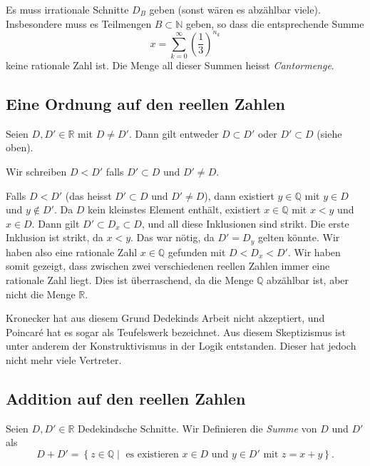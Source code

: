 \documentclass[../main.tex]{subfiles}
\begin{document}
Es muss irrationale Schnitte $D_{B}$ geben (sonst wären es abzählbar viele).
Insbesondere muss es Teilmengen $B \subset \mathbb N$ geben, so dass die
entsprechende Summe
\[x = \sum_{k=0}^{\infty} {\left(\frac{1}{3}\right)}^{n_{k}}\]
keine rationale Zahl ist.
Die Menge all dieser Summen heisst \emph{Cantormenge}.

\subsection*{Eine Ordnung auf den reellen Zahlen}
Seien $D, D' \in \mathbb R$ mit $D \neq D'$. Dann gilt entweder
$D \subset D'$ oder $D' \subset D$ (siehe oben).
\begin{definition}
  Wir schreiben $D < D'$ falls $D' \subset D$ und $D' \neq D$.
\end{definition}

\begin{remark}
  Falls $D < D'$ (das heisst $D' \subset D$ und $D' \neq D$), dann
  existiert $y \in \mathbb Q$ mit $y \in D$ und $y \notin D'$.
  Da $D$ kein kleinstes Element enthält,
  existiert $x \in \mathbb Q$ mit $x < y$ und $x \in D$.
  Dann gilt $D' \subset D_{x} \subset D$, und all diese
  Inklusionen sind strikt. Die erste Inklusion ist strikt,
  da $x < y$. Das war nötig, da $D' = D_{y}$
  gelten könnte. Wir haben also eine rationale Zahl
  $x \in \mathbb Q$ gefunden mit
  $D < D_{x} < D'$.
  Wir haben somit gezeigt, dass zwischen zwei verschiedenen reellen
  Zahlen immer eine rationale Zahl liegt.
  Dies ist überraschend, da die Menge $\mathbb Q$
  abzählbar ist, aber nicht die Menge $\mathbb R$.

  Kronecker hat aus diesem Grund Dedekinds Arbeit nicht akzeptiert,
  und Poincaré hat es sogar als Teufelswerk bezeichnet.
  Aus diesem Skeptizismus ist unter anderem der
  Konstruktivismus in der Logik entstanden.
  Dieser hat jedoch nicht mehr viele Vertreter.
\end{remark}

\subsection*{Addition auf den reellen Zahlen}

\begin{definition}
Seien $D, D' \in \mathbb R$ Dedekindsche Schnitte.
Wir Definieren die \emph{Summe} von $D$ und $D'$ als
\[D + D' = \left\{z \in \mathbb Q \mid \text{ es existieren }
    x \in D \text{ und } y \in D' \text{ mit } z = x + y\right\}.\]
\end{definition}
\end{document}

